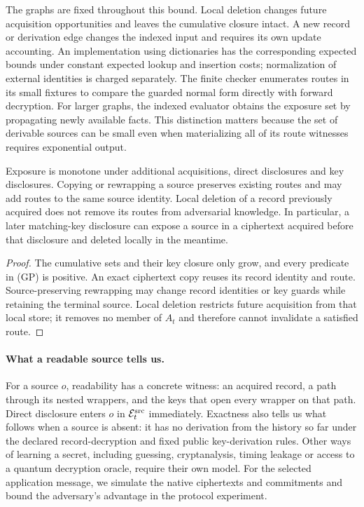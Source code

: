 The graphs are fixed throughout this bound. Local deletion changes future
acquisition opportunities and leaves the cumulative closure intact. A new
record or derivation edge changes the indexed input and requires its own
update accounting. An implementation using dictionaries has the
corresponding expected bounds under constant expected lookup and insertion
costs; normalization of external identities is charged separately.
The finite checker enumerates routes in its small fixtures to compare
the guarded normal form directly with forward decryption. For larger
graphs, the indexed evaluator obtains the exposure set by propagating
newly available facts. This distinction matters because the set of
derivable sources can be small even when materializing all of its route
witnesses requires exponential output.

\begin{corollary}
\label{cor:guarded-history}
Exposure is monotone under additional acquisitions, direct disclosures
and key disclosures. Copying or rewrapping a source preserves existing
routes and may add routes to the same source identity.
Local deletion of a record previously acquired
does not remove its routes from adversarial knowledge.  In particular,
a later matching-key disclosure can expose a source in a ciphertext
acquired before that disclosure and deleted locally in the meantime.
\end{corollary}
\begin{proof}
The cumulative sets and their key closure only grow, and every predicate
in (GP) is positive. An exact ciphertext copy reuses its record identity
and route. Source-preserving rewrapping may change record identities or
key guards while retaining the terminal source. Local deletion
restricts future acquisition from that local store; it removes no member
of $A_t$ and therefore cannot invalidate a satisfied route.
\end{proof}

\paragraph{What a readable source tells us.}
For a source $o$, readability has a concrete witness: an acquired record,
a path through its nested wrappers, and the keys that open every wrapper
on that path. Direct disclosure enters $o$ in
$\mathcal E^{\rm src}_t$ immediately. Exactness also tells us what follows
when a source is absent: it has no derivation from the history so far
under the declared record-decryption and fixed public key-derivation rules.
Other ways of learning a secret, including guessing, cryptanalysis,
timing leakage or access to a quantum decryption oracle, require their
own model. For the selected application message, we simulate the native
ciphertexts and commitments and bound the adversary's advantage in the
protocol experiment.

